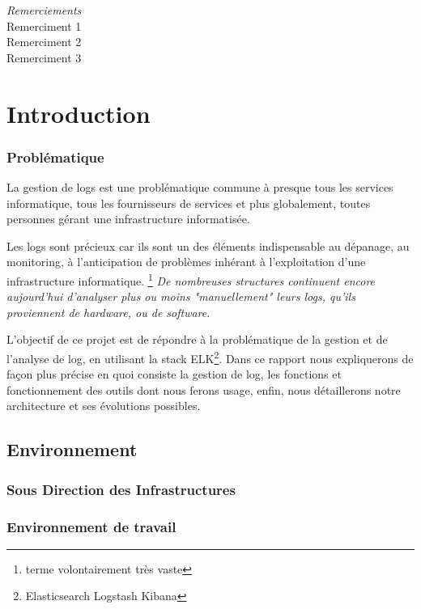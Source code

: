\documentclass[a4paper,12pt,one side,titlepage]{report}
\begin{document}




\emph{\Large Remerciements}
\\[2cm]
Remerciment 1
\\[1cm]
Remerciment 2
\\[2cm]
Remerciment 3


\setcounter{tocdepth}{1}
\tableofcontents

\part{Introduction}

\section{Problématique}
La gestion de \gls{logs} est une problématique commune à presque tous les services informatique,
tous les fournisseurs de services et plus globalement, toutes personnes gérant une infrastructure 
informatisée.

Les \gls{logs} sont précieux car ils sont un des éléments indispensable au dépanage, au monitoring,
à l'anticipation de problèmes inhérant à l'exploitation d'une infrastructure informatique.
\footnote{terme volontairement très vaste}
\emph{De nombreuses structures continuent encore aujourd'hui d'analyser plus ou moins "manuellement" leurs
\emph{\gls{logs}}, qu'ils proviennent de \emph{hardware, ou de software}}.

L'objectif de ce projet est de répondre à la problématique de la gestion et de l'analyse de log, en utilisant
la stack ELK\footnote{Elasticsearch Logstash Kibana}.
Dans ce rapport nous expliquerons de façon plus précise en quoi consiste la gestion de log,
les fonctions et fonctionnement des outils dont nous ferons usage, enfin, nous détaillerons notre 
architecture et ses évolutions possibles.


\chapter{Environnement}
\section{Sous Direction des Infrastructures}
\lipsum
\section{Environnement de travail}
\end{document}
